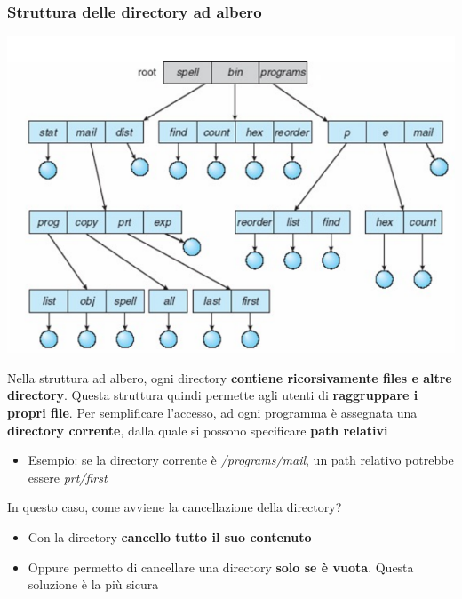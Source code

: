 \documentclass[12pt]{article}
\begin{document}
\subsubsection{Struttura delle directory ad albero}
\begin{center}
    \includegraphics[width = 0.60\linewidth]{Images/27.png}
\end{center}
Nella struttura ad albero, ogni directory \textbf{contiene ricorsivamente files e altre directory}. Questa struttura quindi
permette agli utenti di \textbf{raggruppare i propri file}. Per semplificare l'accesso, ad ogni programma è assegnata una \textbf{directory corrente}, dalla quale si possono specificare
\textbf{path relativi}
\begin{itemize}
    \item Esempio: se la directory corrente è \textit{/programs/mail}, un path relativo potrebbe essere \textit{prt/first}
\end{itemize}
In questo caso, come avviene la cancellazione della directory?
\begin{itemize}
    \item Con la directory \textbf{cancello tutto il suo contenuto}
    \item Oppure permetto di cancellare una directory \textbf{solo se è vuota}. Questa soluzione è la più sicura
\end{itemize}
\end{document}
